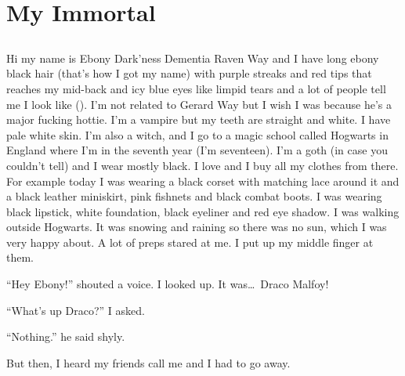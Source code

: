 \chapter{My Immortal}

\section{}


\XXX{\Xfill}

Hi my name is Ebony Dark'ness Dementia Raven Way and I have long ebony black hair (that's how I got my name) with purple streaks and red tips that reaches my mid-back and icy blue eyes like limpid tears and a lot of people tell me I look like  (). I'm not related to Gerard Way but I wish I was because he's a major fucking hottie. I'm a vampire but my teeth are straight and white. I have pale white skin. I'm also a witch, and I go to a magic school called Hogwarts in England where I'm in the seventh year (I'm seventeen). I'm a goth (in case you couldn't tell) and I wear mostly black. I love  and I buy all my clothes from there. For example today I was wearing a black corset with matching lace around it and a black leather miniskirt, pink fishnets and black combat boots. I was wearing black lipstick, white foundation, black eyeliner and red eye shadow. I was walking outside Hogwarts. It was snowing and raining so there was no sun, which I was very happy about. A lot of preps stared at me. I put up my middle finger at them.

\enquote{Hey Ebony!} shouted a voice. I looked up. It was\ldots{}\ Draco Malfoy!

\enquote{What's up Draco?} I asked.

\enquote{Nothing.} he said shyly.

But then, I heard my friends call me and I had to go away.

\XXX{\Xfill}


